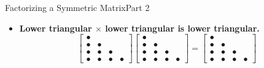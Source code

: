 \documentclass[10pt]{beamer}
\begin{document}
\begin{frame}{Factorizing a Symmetric Matrix}{Part 2}
\begin{itemize}



    \item \textbf{Lower triangular $\times$ lower triangular
    is lower triangular.}
    \[
    \begin{bmatrix}
    \bullet & \phantom{\bullet} & \phantom{\bullet} & \phantom{\bullet}\\
    \bullet & \bullet & \phantom{\bullet} & \phantom{\bullet}\\
    \bullet & \bullet & \bullet & \phantom{\bullet}\\
    \bullet & \bullet & \bullet & \bullet
    \end{bmatrix}
    \begin{bmatrix}
    \bullet & \phantom{\bullet} & \phantom{\bullet} & \phantom{\bullet}\\
    \bullet & \bullet & \phantom{\bullet} & \phantom{\bullet}\\
    \bullet & \bullet & \bullet & \phantom{\bullet}\\
    \bullet & \bullet & \bullet & \bullet
    \end{bmatrix}
    =
    \begin{bmatrix}
    \bullet & \phantom{\bullet} & \phantom{\bullet} & \phantom{\bullet}\\
    \bullet & \bullet & \phantom{\bullet} & \phantom{\bullet}\\
    \bullet & \bullet & \bullet & \phantom{\bullet}\\
    \bullet & \bullet & \bullet & \bullet
    \end{bmatrix}
    \]

    \bigskip


\end{itemize}
\end{frame}
\end{document}
